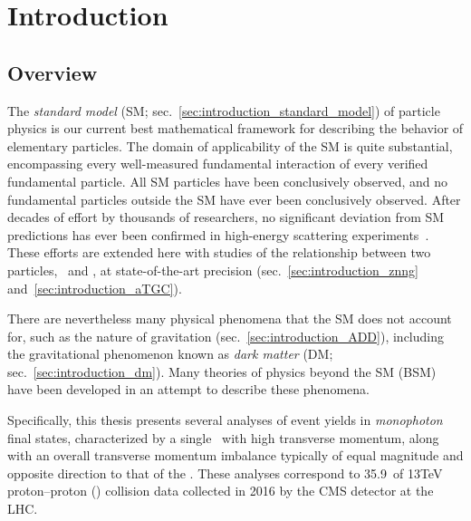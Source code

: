 \chapter{Introduction} \label{chap:introduction}
\section{Overview} \label{sec:introduction_overview}
The \textit{standard model} (SM; sec.~\ref{sec:introduction_standard_model}) of particle physics is our current best mathematical framework for describing the behavior
of elementary particles. The domain of applicability of the SM is quite substantial, encompassing
every well-measured fundamental interaction of every verified fundamental particle. All SM particles have been conclusively observed,
and no fundamental particles outside the SM have ever been conclusively observed. After decades of effort by thousands of researchers,
no significant deviation from SM predictions has ever been confirmed in high-energy scattering experiments~\cite{ref:CahnGoldhaber, ref:PDG}.
These efforts are extended here with studies of the relationship between two particles, \PZ\ and \Pgamma, at state-of-the-art precision
(sec.~\ref{sec:introduction_znng} and~\ref{sec:introduction_aTGC}).

There are nevertheless many physical phenomena that the SM does not account for, such as the nature of gravitation (sec.~\ref{sec:introduction_ADD}),
including the gravitational phenomenon known as \textit{dark matter} (DM; sec.~\ref{sec:introduction_dm}). Many theories of physics beyond the SM (BSM)
have been developed in an attempt to describe these phenomena.

Specifically, this thesis presents several analyses of event yields in \textit{monophoton} final states, characterized by a single \Pgamma\ with
high transverse momentum, along with an overall transverse momentum imbalance typically of equal magnitude and opposite direction to
that of the \Pgamma. These analyses correspond to 35.9\fbinv\ of 13\unit{TeV} proton--proton (\Pp\Pp) collision data collected in 2016 by the CMS
detector at the LHC.

